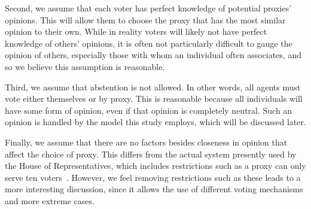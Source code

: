 Second, we assume that each voter has perfect knowledge of potential proxies' opinions.
This will allow them to choose the proxy that has the most similar opinion to their own.
While in reality voters will likely not have perfect knowledge of others' opinions,
it is often not particularly difficult to gauge the opinion of others, especially
those with whom an individual often associates, and so we believe this assumption is
reasonable.

Third, we assume that abstention is not allowed.
In other words, all agents must vote either themselves or by proxy.
This is reasonable because all individuals will have some form of opinion, even if
that opinion is completely neutral.
Such an opinion is handled by the model this study employs, which will be discussed
later.

Finally, we assume that there are no factors besides closeness in opinion that affect
the choice of proxy.
This differs from the actual system presently used by the House of Representatives,
which includes restrictions such as a proxy can only serve ten voters~\cite{CERP2020}.
However, we feel removing restrictions such as these leads to a more interesting
discussion, since it allows the use of different voting mechanisms and more extreme
cases.


